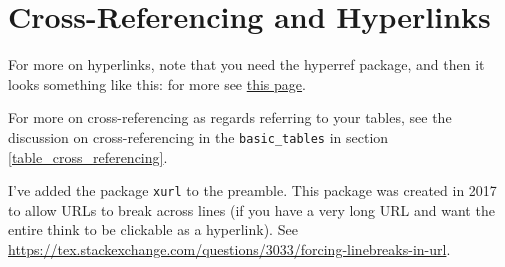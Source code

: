 \section{Cross-Referencing and Hyperlinks}\label{sec:hyperlinks}

For more on hyperlinks, note that you need the hyperref package, and then it looks something like this: for more see \href{https://www.overleaf.com/learn/latex/hyperlinks}{this page}.

For more on cross-referencing as regards referring to your tables, see the discussion on cross-referencing in the \verb+basic_tables+ in section \ref{table_cross_referencing}.

I've added the package \verb+xurl+ to the preamble. This package was created in 2017 to allow URLs to break across lines (if you have a very long URL and want the entire think to be clickable as a hyperlink). See \url{https://tex.stackexchange.com/questions/3033/forcing-linebreaks-in-url}.